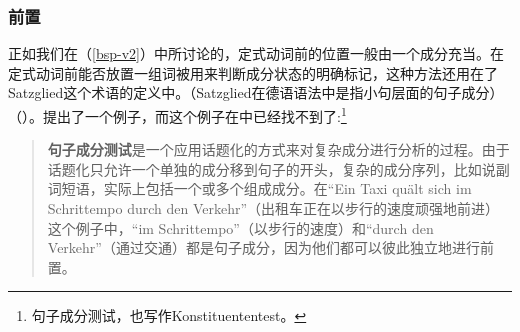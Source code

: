 \subsubsection{前置}
\label{sec-konst-test-probleme-voranstellung} 
正如我们在（\ref{bsp-v2}）中所讨论的，定式动词前的位置一般由一个成分充当。在定式动词前能否放置一组词被用来判断成分状态的明确标记，这种方法还用在了Satzglied这个术语的定义中。（Satzglied在德语语法中是指小句层面的句子成分）（\citep[]{Duden2005-Authors}）。提出了一个例子，而这个例子在中已经找不到了:\footnote{句子成分测试，也写作Konstituententest。}
\begin{quote}
\textbf{句子成分测试}是一个应用话题化的方式来对复杂成分进行分析的过程。由于话题化只允许一个单独的成分移到句子的开头，复杂的成分序列，比如说副词短语，实际上包括一个或多个组成成分。在“Ein Taxi quält sich im Schrittempo durch den Verkehr”（出租车正在以步行的速度顽强地前进）这个例子中，“im Schrittempo”（以步行的速度）和“durch den Verkehr”（通过交通）都是句子成分，因为他们都可以彼此独立地进行前置。\citep[]{Bussmann83a}
\end{quote}

